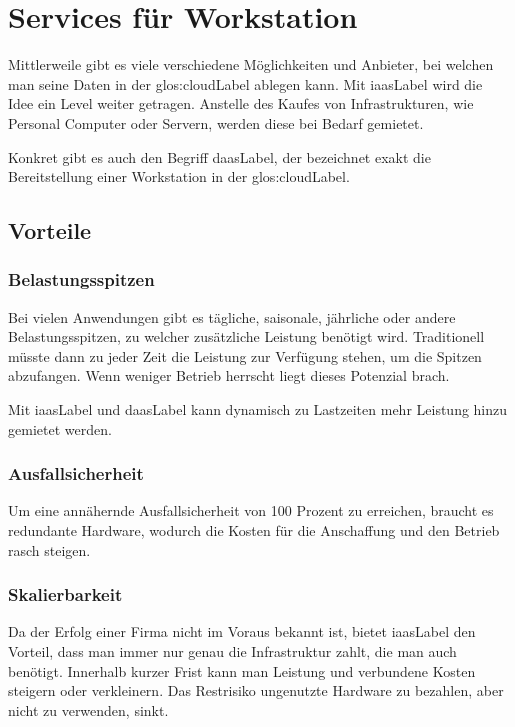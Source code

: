 \section{Services für Workstation}
Mittlerweile gibt es viele verschiedene Möglichkeiten und Anbieter, bei welchen man seine Daten in der \Gls{glos:cloudLabel} ablegen kann. Mit \Gls{iaasLabel} wird die Idee ein Level weiter getragen.
Anstelle des Kaufes von Infrastrukturen, wie Personal Computer oder Servern, werden diese bei Bedarf gemietet.

Konkret gibt es auch den Begriff \Gls{daasLabel}, der bezeichnet exakt die Bereitstellung einer Workstation in der \Gls{glos:cloudLabel}.

\subsection{Vorteile}
\label{sec:Vorteile}
\subsubsection{Belastungsspitzen}
Bei vielen Anwendungen gibt es tägliche, saisonale, jährliche oder andere Belastungsspitzen, zu welcher zusätzliche Leistung benötigt wird.
Traditionell müsste dann zu jeder Zeit die Leistung zur Verfügung stehen, um die Spitzen abzufangen. Wenn weniger Betrieb herrscht liegt dieses Potenzial brach.

Mit \Gls{iaasLabel} und \Gls{daasLabel} kann dynamisch zu Lastzeiten mehr Leistung hinzu gemietet werden.



\subsubsection{Ausfallsicherheit}
Um eine annähernde Ausfallsicherheit von 100 Prozent zu erreichen, braucht es redundante Hardware, wodurch die Kosten für die Anschaffung und den Betrieb rasch steigen.

\subsubsection{Skalierbarkeit}
Da der Erfolg einer Firma nicht im Voraus bekannt ist, bietet \Gls{iaasLabel} den Vorteil, dass man immer nur genau die Infrastruktur zahlt, die man auch benötigt.
Innerhalb kurzer Frist kann man Leistung und verbundene Kosten steigern oder verkleinern.
Das Restrisiko ungenutzte Hardware zu bezahlen, aber nicht zu verwenden, sinkt.

